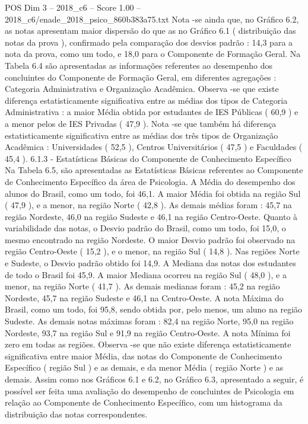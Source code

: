 \begin{textsample}{POS Dim 3 – 2018\_c6 – Score 1.00 – 2018\_c6/enade\_2018\_psico\_860b383a75.txt}
Nota -se ainda que, no Gráfico 6.2, as notas apresentam maior dispersão do que as no Gráfico 6.1 ( distribuição das notas da prova ), confirmado pela comparação dos desvios padrão : 14,3 para a nota da prova, como um todo, e 18,0 para o Componente de Formação Geral.
Na Tabela 6.4 são apresentadas as informações referentes ao desempenho dos concluintes do Componente de Formação Geral, em diferentes agregações : Categoria Administrativa e Organização Acadêmica.
Observa -se que existe diferença estatisticamente significativa entre as médias dos tipos de Categoria Administrativa : a maior Média obtida por estudantes de IES Públicas ( 60,9 ) e a menor pelos de IES Privadas ( 47,9 ).
Nota -se que também há diferença estatisticamente significativa entre as médias dos três tipos de Organização Acadêmica : Universidades ( 52,5 ), Centros Universitários ( 47,5 ) e Faculdades ( 45,4 ). 6.1.3 - Estatísticas Básicas do Componente de Conhecimento Específico Na Tabela 6.5, são apresentadas as Estatísticas Básicas referentes ao Componente de Conhecimento Específico da área de Psicologia.
A Média do desempenho dos alunos do Brasil, como um todo, foi 46,1.
A maior Média foi obtida na região Sul ( 47,9 ), e a menor, na região Norte ( 42,8 ).
As demais médias foram : 45,7 na região Nordeste, 46,0 na região Sudeste e 46,1 na região Centro-Oeste.
Quanto à variabilidade das notas, o Desvio padrão do Brasil, como um todo, foi 15,0, o mesmo encontrado na região Nordeste.
O maior Desvio padrão foi observado na região Centro-Oeste ( 15,2 ), e o menor, na região Sul ( 14,8 ).
Nas regiões Norte e Sudeste, o Desvio padrão obtido foi 14,9.
A Mediana das notas dos estudantes de todo o Brasil foi 45,9.
A maior Mediana ocorreu na região Sul ( 48,0 ), e a menor, na região Norte ( 41,7 ).
As demais medianas foram : 45,2 na região Nordeste, 45,7 na região Sudeste e 46,1 na Centro-Oeste.
A nota Máxima do Brasil, como um todo, foi 95,8, sendo obtida por, pelo menos, um aluno na região Sudeste.
As demais notas máximas foram : 82,4 na região Norte, 95,0 na região Nordeste, 93,7 na região Sul e 91,9 na região Centro-Oeste.
A nota Mínima foi zero em todas as regiões.
Observa -se que não existe diferença estatisticamente significativa entre maior Média, das notas do Componente de Conhecimento Específico ( região Sul ) e as demais, e da menor Média ( região Norte ) e as demais.
Assim como nos Gráficos 6.1 e 6.2, no Gráfico 6.3, apresentado a seguir, é possível ser feita uma avaliação do desempenho de concluintes de Psicologia em relação ao Componente de Conhecimento Específico, com um histograma da distribuição das notas correspondentes.

\end{textsample}
